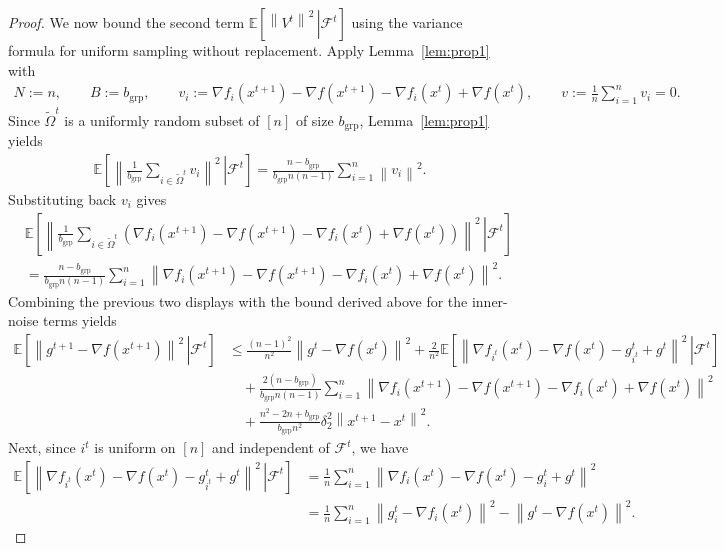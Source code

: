 \documentclass{article}
\newcommand{\sqn}[1]{\left\| #1 \right\|^2}
\newcommand{\eqdef}{:=}
\newcommand{\Expb}[2]{\mathbb{E}\!\left[\left. #1\,\right|#2 \right]}
\newcommand{\Expc}[1]{\Expb{#1}{\mathcal{F}^t}}
\theoremstyle{plain}
\begin{document}
\begin{proof}
We now bound the second term $\Expc{\sqn{V^t}}$ using the variance formula for uniform sampling without replacement.
Apply Lemma~\ref{lem:prop1} with
\begin{align*}
N\eqdef n,\qquad B\eqdef b_{\mathrm{grp}},\qquad
v_i \eqdef \nabla f_{i}(x^{t+1})-\nabla f(x^{t+1})-\nabla f_{i}(x^{t})+\nabla f(x^{t}),
\qquad
v \eqdef \frac{1}{n}\sum_{i=1}^n v_i = 0.
\end{align*}
Since $\tilde{\Omega}^t$ is a uniformly random subset of $[n]$ of size $b_{\mathrm{grp}}$, Lemma~\ref{lem:prop1} yields
\begin{align*}
\Expc{\sqn{\frac{1}{b_{\mathrm{grp}}}\sum_{i\in\tilde{\Omega}^t} v_i}}
=\frac{n-b_{\mathrm{grp}}}{b_{\mathrm{grp}}n(n-1)}\sum_{i=1}^n \sqn{v_i}.
\end{align*}
Substituting back $v_i$ gives
\begin{align*}
&\Expc{\sqn{\frac{1}{b_{\mathrm{grp}}}\sum_{i\in\tilde{\Omega}^t}\left( \nabla f_{i}(x^{t+1})-\nabla f(x^{t+1})-\nabla f_{i}(x^{t})+\nabla f(x^{t})\right)}}\\
&= \frac{n-b_{\mathrm{grp}}}{b_{\mathrm{grp}}n(n-1)}\sum_{i=1}^n \sqn{ \nabla f_{i}(x^{t+1})-\nabla f(x^{t+1})-\nabla f_{i}(x^{t})+\nabla f(x^{t})}.
\end{align*}
Combining the previous two displays with the bound derived above for the inner-noise terms yields
\begin{align*}
\Expc{ \sqn{g^{t+1}-\nabla f(x^{t+1})}}
&\leq\frac{(n-1)^2}{n^2} \sqn{g^t-\nabla f(x^{t})}
+\frac{2}{n^2}\Expc{\sqn{\nabla f_{i^t}(x^{t})-\nabla f(x^{t})-g_{i^t}^t+g^t}}\\
&\quad+ \frac{2(n-b_{\mathrm{grp}})}{b_{\mathrm{grp}}n(n-1)}\sum_{i=1}^n \sqn{ \nabla f_{i}(x^{t+1})-\nabla f(x^{t+1})-\nabla f_{i}(x^{t})+\nabla f(x^{t})}\\
&\quad+\frac{n^2-2n+b_{\mathrm{grp}}}{b_{\mathrm{grp}}n^2}\delta_2^2\sqn{x^{t+1}-x^t}.
\end{align*}
Next, since $i^t$ is uniform on $[n]$ and independent of $\mathcal{F}^t$, we have
\begin{align*}
\Expc{\sqn{\nabla f_{i^t}(x^{t})-\nabla f(x^{t})-g_{i^t}^t+g^t}}
&=\frac{1}{n}\sum_{i=1}^n \sqn{\nabla f_{i}(x^{t})-\nabla f(x^{t})-g_{i}^t+g^t}\\
&=\frac{1}{n}\sum_{i=1}^n \sqn{g_i^t-\nabla f_{i}(x^{t})}
-\sqn{g^t-\nabla f(x^{t})}.
\end{align*}


\end{proof}
\end{document}
